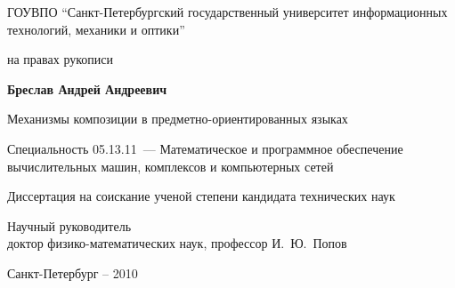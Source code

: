 \thispagestyle{empty}
\begin{center}\Large 
ГОУВПО ``Санкт-Петербургский государственный университет информационных технологий, механики и оптики''
\end{center}
\vfill

\begin{flushright}\Large
на правах рукописи
\end{flushright}
\vfill

\begin{center}\Large\bf
Бреслав Андрей Андреевич
\end{center}
\vfill

\begin{center}\Large
Механизмы композиции в предметно-ориентированных языках
\end{center}
\vfill

\begin{center}\Large
Специальность 05.13.11~--- Математическое и
программное обеспечение вычислительных машин, комплексов и
компьютерных сетей
\end{center}
\vfill

\begin{center}\Large
Диссертация на соискание ученой степени 
кандидата технических наук
\end{center}
\vfill

\hfill
\begin{minipage}{0.7\textwidth}
\begin{flushleft}\Large
Научный руководитель \\
доктор физико-математических
наук, профессор И.~Ю.~Попов
\end{flushleft}
\end{minipage}
\vfill

\begin{center}\Large
Санкт-Петербург -- 2010
\end{center}
\newpage